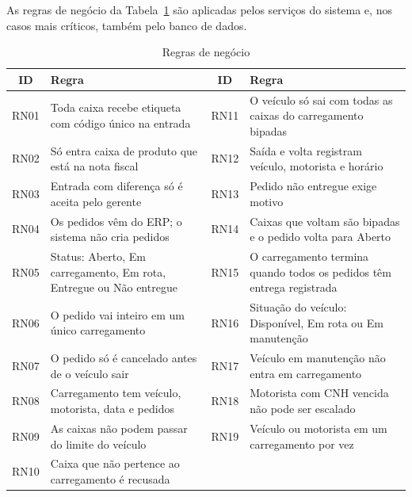 As regras de negócio da Tabela~\ref{tab:rn} são aplicadas pelos serviços do sistema e, nos casos mais críticos, também pelo banco de dados.

\begin{table}[htbp]
\centering
\caption{Regras de negócio}
\label{tab:rn}
\footnotesize
\begin{tabular}{|c|p{5.9cm}|c|p{5.9cm}|}
\hline
\textbf{ID} & \textbf{Regra} & \textbf{ID} & \textbf{Regra} \\ \hline
RN01 & Toda caixa recebe etiqueta com código único na entrada & RN11 & O veículo só sai com todas as caixas do carregamento bipadas \\ \hline
RN02 & Só entra caixa de produto que está na nota fiscal & RN12 & Saída e volta registram veículo, motorista e horário \\ \hline
RN03 & Entrada com diferença só é aceita pelo gerente & RN13 & Pedido não entregue exige motivo \\ \hline
RN04 & Os pedidos vêm do ERP; o sistema não cria pedidos & RN14 & Caixas que voltam são bipadas e o pedido volta para Aberto \\ \hline
RN05 & Status: Aberto, Em carregamento, Em rota, Entregue ou Não entregue & RN15 & O carregamento termina quando todos os pedidos têm entrega registrada \\ \hline
RN06 & O pedido vai inteiro em um único carregamento & RN16 & Situação do veículo: Disponível, Em rota ou Em manutenção \\ \hline
RN07 & O pedido só é cancelado antes de o veículo sair & RN17 & Veículo em manutenção não entra em carregamento \\ \hline
RN08 & Carregamento tem veículo, motorista, data e pedidos & RN18 & Motorista com CNH vencida não pode ser escalado \\ \hline
RN09 & As caixas não podem passar do limite do veículo & RN19 & Veículo ou motorista em um carregamento por vez \\ \hline
RN10 & Caixa que não pertence ao carregamento é recusada & & \\ \hline
\end{tabular}
\end{table}
